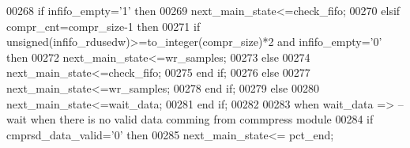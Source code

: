 \begin{DoxyCode}
00268                 \textcolor{keywordflow}{if} \textcolor{vhdlchar}{infifo_empty}\textcolor{vhdlchar}{=}\textcolor{vhdlchar}{'}\textcolor{vhdllogic}{}\textcolor{vhdllogic}{1}\textcolor{vhdlchar}{'} \textcolor{keywordflow}{then} 
00269                     \textcolor{vhdlchar}{next_main_state}\textcolor{vhdlchar}{<=}\textcolor{vhdlchar}{check\_fifo};
00270                 \textcolor{keywordflow}{elsif} \textcolor{vhdlchar}{compr_cnt}\textcolor{vhdlchar}{=}\textcolor{vhdlchar}{compr_size}\textcolor{vhdlchar}{-}\textcolor{vhdllogic}{}\textcolor{vhdllogic}{1} \textcolor{keywordflow}{then} 
00271                     \textcolor{keywordflow}{if} \textcolor{comment}{unsigned}\textcolor{vhdlchar}{(}\textcolor{vhdlchar}{infifo_rdusedw}\textcolor{vhdlchar}{)}\textcolor{vhdlchar}{>=}\textcolor{vhdlchar}{to\_integer}\textcolor{vhdlchar}{(}\textcolor{vhdlchar}{compr_size}\textcolor{vhdlchar}{)}\textcolor{vhdlchar}{*}\textcolor{vhdllogic}{}\textcolor{vhdllogic}{2} \textcolor{keywordflow}{and} \textcolor{vhdlchar}{
      infifo_empty}\textcolor{vhdlchar}{=}\textcolor{vhdlchar}{'}\textcolor{vhdllogic}{}\textcolor{vhdllogic}{0}\textcolor{vhdlchar}{'} \textcolor{keywordflow}{then}
00272                         \textcolor{vhdlchar}{next_main_state}\textcolor{vhdlchar}{<=}\textcolor{vhdlchar}{wr\_samples};
00273                     \textcolor{keywordflow}{else} 
00274                         \textcolor{vhdlchar}{next_main_state}\textcolor{vhdlchar}{<=}\textcolor{vhdlchar}{check\_fifo};
00275                     \textcolor{keywordflow}{end} \textcolor{keywordflow}{if};
00276                 \textcolor{keywordflow}{else}
00277                     \textcolor{vhdlchar}{next_main_state}\textcolor{vhdlchar}{<=}\textcolor{vhdlchar}{wr\_samples};
00278                 \textcolor{keywordflow}{end} \textcolor{keywordflow}{if};
00279             \textcolor{keywordflow}{else}
00280                 \textcolor{vhdlchar}{next_main_state}\textcolor{vhdlchar}{<=}\textcolor{vhdlchar}{wait\_data};
00281             \textcolor{keywordflow}{end} \textcolor{keywordflow}{if};
00282           
00283         \textcolor{keywordflow}{when} \textcolor{vhdlchar}{wait\_data} \textcolor{vhdlchar}{=}\textcolor{vhdlchar}{>}\textcolor{keyword}{   --wait when there is no valid data comming from commpress module}
00284             \textcolor{keywordflow}{if} \textcolor{vhdlchar}{cmprsd_data_valid}\textcolor{vhdlchar}{=}\textcolor{vhdlchar}{'}\textcolor{vhdllogic}{}\textcolor{vhdllogic}{0}\textcolor{vhdlchar}{'} \textcolor{keywordflow}{then} 
00285                 \textcolor{vhdlchar}{next_main_state}\textcolor{vhdlchar}{<=} \textcolor{vhdlchar}{pct\_end};

\end{DoxyCode}
